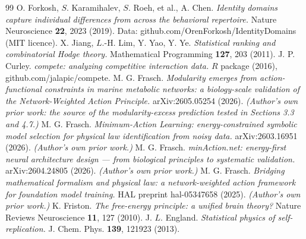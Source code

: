\documentclass[aps,pre,preprint,superscriptaddress,nofootinbib,longbibliography]{revtex4-2}
\begin{document}
\begin{thebibliography}{99}
 O. Forkosh, $S$. Karamihalev, $S$. Roeh, et al., A. Chen. \emph{Identity domains capture individual differences from across the behavioral repertoire.} Nature Neuroscience \textbf{22}, 2023 (2019). Data: github.com/OrenForkosh/IdentityDomains (MIT licence).
 X. Jiang, $L$.-H. Lim, Y. Yao, Y. Ye. \emph{Statistical ranking and combinatorial Hodge theory.} Mathematical Programming \textbf{127}, 203 (2011).
 J. P. Curley. \emph{compete: analyzing competitive interaction data.} $R$ package (2016), github.com/jalapic/compete.
 M. G. Frasch. \emph{Modularity emerges from action-functional constraints in marine metabolic networks: a biology-scale validation of the Network-Weighted Action Principle.} arXiv:2605.05254 (2026). \emph{(Author's own prior work: the source of the modularity-excess prediction tested in Sections 3.3 and 4.7.)}
 M. G. Frasch. \emph{Minimum-Action Learning: energy-constrained symbolic model selection for physical law identification from noisy data.} arXiv:2603.16951 (2026). \emph{(Author's own prior work.)}
 M. G. Frasch. \emph{minAction.net: energy-first neural architecture design --- from biological principles to systematic validation.} arXiv:2604.24805 (2026). \emph{(Author's own prior work.)}
 M. G. Frasch. \emph{Bridging mathematical formalism and physical law: a network-weighted action framework for foundation model training.} HAL preprint hal-05347658 (2025). \emph{(Author's own prior work.)}
 K. Friston. \emph{The free-energy principle: a unified brain theory?} Nature Reviews Neuroscience \textbf{11}, 127 (2010).
 J. $L$. England. \emph{Statistical physics of self-replication.} J. Chem. Phys. \textbf{139}, 121923 (2013).
\end{thebibliography}
\end{document}

